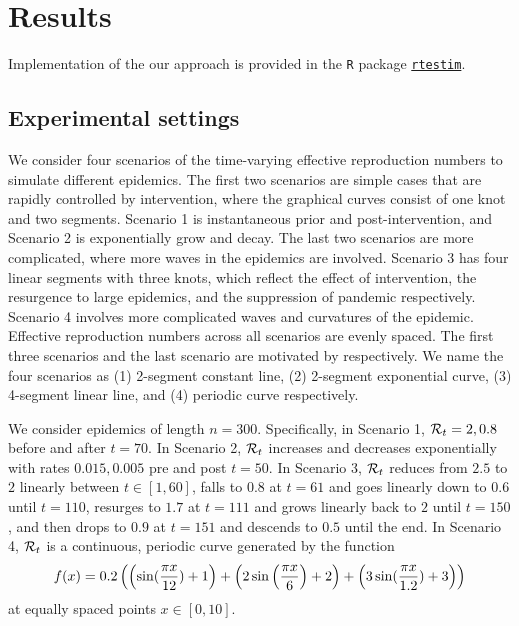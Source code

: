 \section{Results}

Implementation of the our approach is provided in the \texttt{R} package \href{https://dajmcdon.github.io/rtestim/}{\texttt{rtestim}}. 


\subsection{Experimental settings}

We consider four scenarios of the time-varying effective reproduction numbers to simulate different epidemics. The first two scenarios are simple cases that are rapidly controlled by intervention, where the graphical curves consist of one knot and two segments. Scenario 1 is instantaneous prior and post-intervention, and Scenario 2 is exponentially grow and decay. The last two scenarios are more complicated, where more waves in the epidemics are involved. Scenario 3 has four linear segments with three knots, which reflect the effect of intervention, the resurgence to large epidemics, and the suppression of pandemic respectively. Scenario 4 involves more complicated waves and curvatures of the epidemic. Effective reproduction numbers across all scenarios are evenly spaced. 
The first three scenarios and the last scenario are motivated by \cite{parag2021improved, gressani2022epilps} respectively. 
We name the four scenarios as (1) 2-segment constant line, (2) 2-segment exponential curve, (3) 4-segment linear line, and (4) periodic curve respectively. 

We consider epidemics of length $n=300$. 
Specifically, in Scenario 1, $\mathcal{R}_t = 2, 0.8$ before and after $t=70$. In Scenario 2, $\mathcal{R}_t$ increases and decreases exponentially with rates $0.015, 0.005$ pre and post $t=50$. In Scenario 3, $\mathcal{R}_t$ reduces from $2.5$ to $2$ linearly between $t\in[1,60]$, falls to $0.8$ at $t=61$ and goes linearly down to $0.6$ until $t=110$, resurges to $1.7$ at $t=111$ and grows linearly back to $2$ until $t=150$, and then drops to $0.9$ at $t=151$ and descends to $0.5$ until the end. In Scenario 4, $\mathcal{R}_t$ is a continuous, periodic curve generated by the function $$f(x) = 0.2 \left( \left(\sin(\frac{\pi x}{12}) + 1\right) + \left(2 \sin\left(\frac{\pi x}{6}\right) + 2\right) + \left(3 \sin(\frac{\pi x}{1.2}) + 3\right) \right)$$ at equally spaced points $x\in [0,10]$. 


